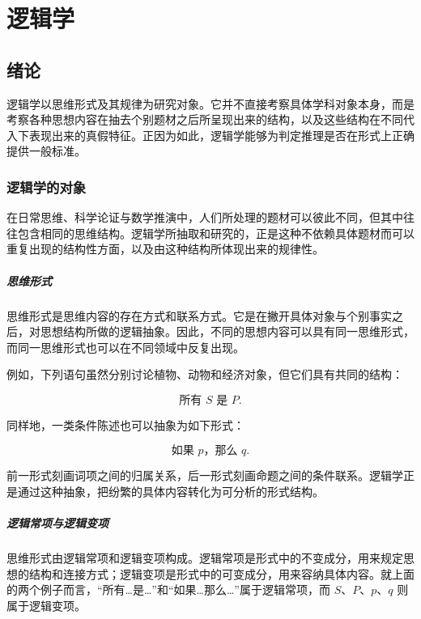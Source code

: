 
\chapter{逻辑学}
\section{绪论}

逻辑学以思维形式及其规律为研究对象。它并不直接考察具体学科对象本身，而是考察各种思想内容在抽去个别题材之后所呈现出来的结构，以及这些结构在不同代入下表现出来的真假特征。正因为如此，逻辑学能够为判定推理是否在形式上正确提供一般标准。

\subsection{逻辑学的对象}

在日常思维、科学论证与数学推演中，人们所处理的题材可以彼此不同，但其中往往包含相同的思维结构。逻辑学所抽取和研究的，正是这种不依赖具体题材而可以重复出现的结构性方面，以及由这种结构所体现出来的规律性。

\paragraph{思维形式}\label{logic.thought_form}

思维形式是思维内容的存在方式和联系方式。它是在撇开具体对象与个别事实之后，对思想结构所做的逻辑抽象。因此，不同的思想内容可以具有同一思维形式，而同一思维形式也可以在不同领域中反复出现。

例如，下列语句虽然分别讨论植物、动物和经济对象，但它们具有共同的结构：

\[
	\text{所有 } S \text{ 是 } P.
\]

同样地，一类条件陈述也可以抽象为如下形式：

\[
	\text{如果 } p\text{，那么 } q.
\]

前一形式刻画词项之间的归属关系，后一形式刻画命题之间的条件联系。逻辑学正是通过这种抽象，把纷繁的具体内容转化为可分析的形式结构。

\paragraph{逻辑常项与逻辑变项}\label{logic.logical_constant}\label{logic.logical_variable}

思维形式由逻辑常项和逻辑变项构成。逻辑常项是形式中的不变成分，用来规定思想的结构和连接方式；逻辑变项是形式中的可变成分，用来容纳具体内容。就上面的两个例子而言，“所有\dots 是\dots”和“如果\dots 那么\dots”属于逻辑常项，而 $S$、$P$、$p$、$q$ 则属于逻辑变项。

